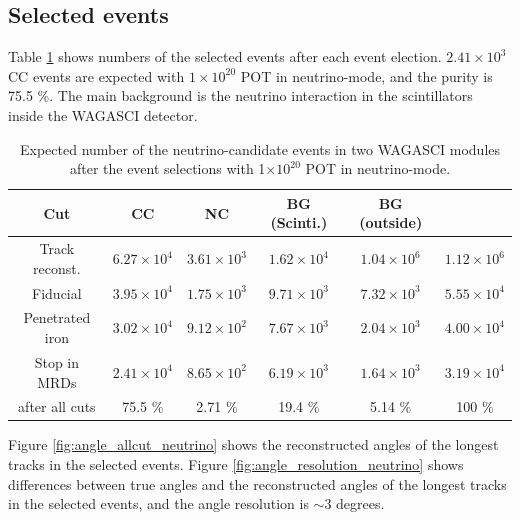 \subsection{Selected events}

Table \ref{tab:expected_num_events_neutrino_beam} shows numbers of the selected events after each event election.
$2.41 \times 10^{3}$ CC events are expected with $1 \times 10^{20}$  POT in neutrino-mode, and the purity is 75.5 \%.
The main background is the neutrino interaction in the scintillators inside the WAGASCI detector.

\begin{table}[htb]
  \begin{center}
    \caption{Expected number of the neutrino-candidate events in two WAGASCI modules after the event selections with 1$\times 10^{20}$ POT in neutrino-mode.}
    \begin{tabular}{c|cccc|c} \hline
      Cut & CC & NC & BG (Scinti.) & BG (outside) \\ \hline
     Track reconst. & $6.27 \times 10^{4}$  & $3.61\times10^{3}$ & $1.62 \times10^{4}$ & $1.04 \times 10^{6}$ & $1.12 \times 10^{6}$ \\
     Fiducial & $3.95 \times 10^{4}$  & $1.75 \times10^{3}$ & $9.71 \times10^{3}$ & $7.32 \times 10^{3}$ & $5.55 \times 10^{4}$ \\
     Penetrated iron & $3.02 \times 10^{4}$  & $9.12 \times10^{2}$ & $7.67 \times10^{3}$ & $2.04 \times 10^{3}$ & $4.00 \times 10^{4}$ \\
     Stop in MRDs & $2.41 \times 10^{4}$  & $8.65 \times10^{2}$ & $6.19 \times10^{3}$ & $1.64 \times 10^{3}$ & $3.19 \times 10^{4}$ \\ \hline
     after all cuts & 75.5 \% & 2.71 \% & 19.4 \% & 5.14 \% & 100 \% \\
     \hline
    \end{tabular}
    \label{tab:expected_num_events_neutrino_beam}
  \end{center}
\end{table}


Figure \ref{fig:angle_allcut_neutrino} shows the reconstructed angles of the longest tracks in the selected events.
Figure \ref{fig:angle_resolution_neutrino} shows differences between true angles and the reconstructed angles of the longest tracks in the selected events, and the angle resolution is $\sim$3 degrees.

